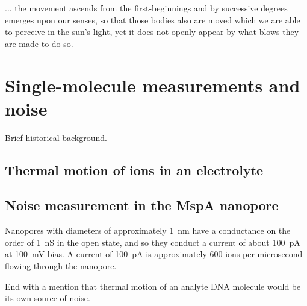 \begin{savequote}[75mm]
... the movement ascends from the first-beginnings and by successive degrees emerges upon our senses, so that those bodies also are moved which we are able to perceive in the sun's light, yet it does not openly appear by what blows they are made to do so.
\end{savequote}

\chapter{Single-molecule measurements and noise}
\label{thermal_motion}

Brief historical background.

\section{Thermal motion of ions in an electrolyte}

\section{Noise measurement in the MspA nanopore}

Nanopores with diameters of approximately \SI{1}{\nm} have a conductance on the order of \SI{1}{\nano\siemens} in the open state, and so they conduct a current of about \SI{100}{\pA} at \SI{100}{\mV} bias.  A current of \SI{100}{\pA} is approximately \num{600} ions per microsecond flowing through the nanopore.

End with a mention that thermal motion of an analyte DNA molecule would be its own source of noise.